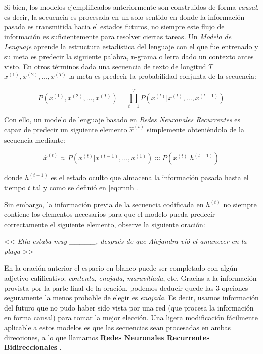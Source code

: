 Si bien, los modelos ejemplificados anteriormente son construidos de forma \textit{causal}, es
decir, la secuencia es procesada en un solo sentido en donde la información pasada es transmitida
hacia el estados futuros, no siempre este flujo de información es suficientemente para resolver
ciertas tareas. Un \textit{Modelo de Lenguaje} aprende la estructura estadística del lenguaje con el
que fue entrenado y su meta es predecir la siguiente palabra, n-grama o letra dado un contexto antes
visto. En otros términos dada una secuencia de texto de longitud $T$ $x^{(1)}, x^{(2)}, ..., x^{(T)}$
la meta es predecir la probabilidad conjunta de la secuencia:

\begin{equation}
    P(x^{(1)}, x^{(2)}, ..., x^{(T)}) = \prod_{t=1}^{T} P(x^{(t)} | x^{(t)}, \dots , x^{(t-1)})
\end{equation}

Con ello, un modelo de lenguaje basado en \textit{Redes Neuronales Recurrentes} es capaz de predecir
un siguiente elemento $\hat x^{(t)}$ simplemente obteniéndolo de la secuencia mediante:

\begin{equation}
    \hat x^{(t)} \approx P(x^{(t)} | x^{(t-1)}, \dots, x^{(1)}) \approx P(x^{(t)} | h^{(t-1)})
\end{equation}

donde $h^{(t-1)}$ es el estado oculto que almacena la información pasada hasta el tiempo $t$
tal y como se definió en \ref{eq:rnnh}.

Sin embargo, la información previa de la secuencia codificada en $h^{(t)}$ no siempre contiene los
elementos necesarios para que el modelo pueda predecir correctamente el siguiente elemento,
observe la siguiente oración:

\begin{center}
    << \textit{Ella estaba muy \_\_\_\_\_, después de que Alejandra vió el amanecer en la playa } >>
\end{center}

En la oración anterior el espacio en blanco puede ser completado con algún adjetivo calificativo;
\textit{contenta}, \textit{enojada}, \textit{maravillada}, etc. Gracias a la información provista por
la parte final de la oración, podemos deducir quede las 3 opciones seguramente la menos probable de
elegir es \textit{enojada}. Es decir, usamos información del futuro que no pudo haber sido vista por
una red (que procesa la información en forma causal) para tomar la mejor elección. Una ligera
modificación fácilmente aplicable a estos modelos es que las secuencias sean procesadas
en ambas direcciones, a lo que llamamos \textbf{Redes Neuronales Recurrentes Bidireccionales}
\cite{Schuster}.


